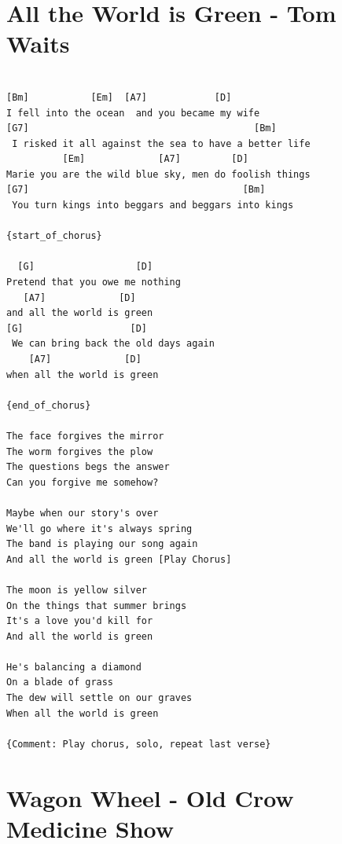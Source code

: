 \documentclass[]{book}
\let\stdsection\section
\renewcommand\section{\clearpage\stdsection}
\begin{document}
\hypertarget{all-the-world-is-green---tom-waits}{%
\section{All the World is Green - Tom Waits}\label{all-the-world-is-green---tom-waits}}

\begin{verbatim}

[Bm]           [Em]  [A7]            [D]
I fell into the ocean  and you became my wife
[G7]                                        [Bm]
 I risked it all against the sea to have a better life
          [Em]             [A7]         [D]
Marie you are the wild blue sky, men do foolish things
[G7]                                      [Bm]
 You turn kings into beggars and beggars into kings

{start_of_chorus}

  [G]                  [D] 
Pretend that you owe me nothing      
   [A7]             [D]
and all the world is green
[G]                   [D]        
 We can bring back the old days again     
    [A7]             [D]
when all the world is green

{end_of_chorus}

The face forgives the mirror
The worm forgives the plow
The questions begs the answer
Can you forgive me somehow?

Maybe when our story's over
We'll go where it's always spring
The band is playing our song again
And all the world is green [Play Chorus]

The moon is yellow silver
On the things that summer brings
It's a love you'd kill for
And all the world is green

He's balancing a diamond
On a blade of grass
The dew will settle on our graves
When all the world is green

{Comment: Play chorus, solo, repeat last verse}
\end{verbatim}

\hypertarget{wagon-wheel---old-crow-medicine-show}{%
\section{Wagon Wheel - Old Crow Medicine Show}\label{wagon-wheel---old-crow-medicine-show}}
\end{document}
